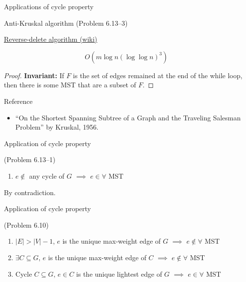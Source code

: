 \begin{frame}{Applications of cycle property}
  \begin{exampleblock}{Anti-Kruskal algorithm (Problem 6.13--3)}
	\centerline{\href{https://en.wikipedia.org/wiki/Reverse-delete_algorithm}{Reverse-delete algorithm (wiki)}}

	\[
	  O(m \log n (\log \log n)^3)
	\]
  \end{exampleblock}

  \begin{proof}
	\textbf{Invariant: } If $F$ is the set of edges remained at the end of the while loop, 
	then there is some MST that are a subset of $F$.
  \end{proof}

  \begin{alertblock}{Reference}
	\begin{itemize}
	  \item ``On the Shortest Spanning Subtree of a Graph and the Traveling Salesman Problem'' by Kruskal, 1956.
	\end{itemize}
  \end{alertblock}
\end{frame}
\begin{frame}{Application of cycle property}
  \begin{exampleblock}{(Problem 6.13--1)}
	\begin{enumerate}[(1)]
	  \item $e \notin$ any cycle of $G$ $\implies$ $e \in \forall$ MST
	\end{enumerate}
  \end{exampleblock}

  \centerline{By contradiction.}
\end{frame}
\begin{frame}{Application of cycle property}
  \begin{exampleblock}{(Problem 6.10)}
	\begin{enumerate}[(1)]
	  \item $|E| > |V| - 1$, $e$ is the unique max-weight edge of $G$ $\implies$ $e \notin \forall$ MST
	  \item $\exists C \subseteq G$, $e$ is the unique max-weight edge of $C$ $\implies$ $e \notin \forall$ MST
	  \setcounter{enumi}{4}
	  \item Cycle $C \subseteq G$, $e \in C$ is the unique lightest edge of $G$ $\implies$ $e \in \forall$ MST
	\end{enumerate}
  \end{exampleblock}
\end{frame}

